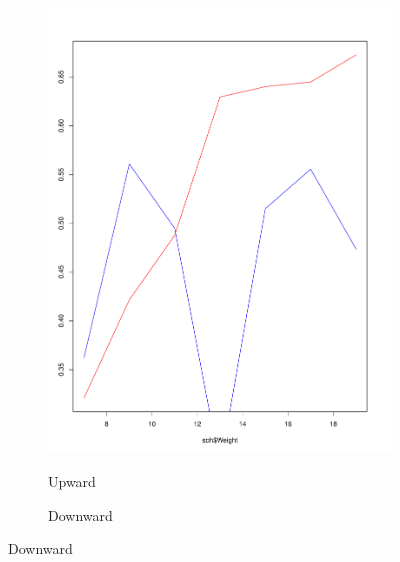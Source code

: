 \documentclass{itatnew}
\begin{document}
\begin{figure}[htp]
  \begin{subfigure}{\linewidth}
    \caption{Upward}
    \includegraphics[width=\linewidth]{images/SoHUpBlur}
    \label{fig:UpwardBlur}
  \end{subfigure}
  \hspace{1em}
  \begin{subfigure}{\linewidth}
    \caption{Downward}

\end{subfigure}
\end{figure}
\end{document}
